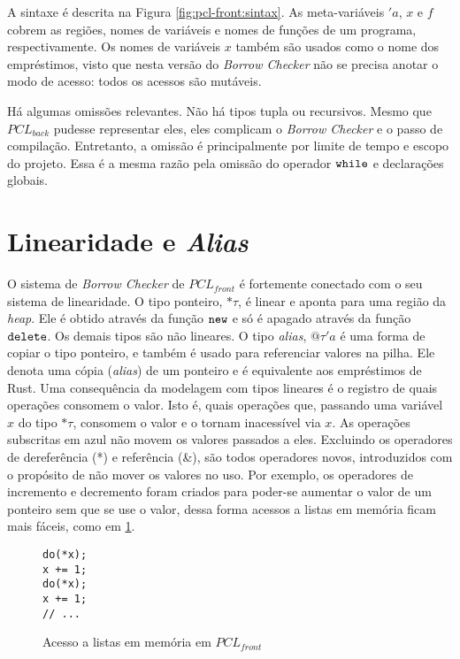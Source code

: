 A sintaxe é descrita na Figura \ref{fig:pcl-front:sintax}. As meta-variáveis \noindent$'a$, $x$ e $f$ cobrem as regiões, nomes de variáveis e nomes de funções de um programa, respectivamente. Os nomes de variáveis $x$ também são usados como o nome dos empréstimos, visto que nesta versão do \emph{Borrow Checker} não se precisa anotar o modo de acesso: todos os acessos são mutáveis.
 
Há algumas omissões relevantes. Não há tipos tupla ou recursivos. Mesmo que $PCL_{back}$ pudesse representar eles, eles complicam o \emph{Borrow Checker} e o passo de compilação. Entretanto, a omissão é principalmente por limite de tempo e escopo do projeto. Essa é a mesma razão pela omissão do operador $\texttt{while}$ e declarações globais.


\section{Linearidade e \emph{Alias}}

O sistema de \emph{Borrow Checker} de $PCL_{front}$ é fortemente conectado com o seu sistema de linearidade. O tipo ponteiro, $\text{*}\tau$, é linear e aponta para uma região da \emph{heap}. Ele é obtido através da função $\texttt{new}$ e só é apagado através da função $\texttt{delete}$. Os demais tipos são não lineares. O tipo \emph{alias}, $@\tau'a$ é uma forma de copiar o tipo ponteiro, e também é usado para referenciar valores na pilha. Ele denota uma cópia (\emph{alias}) de um ponteiro e é equivalente aos empréstimos de Rust. Uma consequência da modelagem com tipos lineares é o registro de quais operações consomem o valor. Isto é, quais operações que, passando uma variável $x$ do tipo $\text{*}\!\tau$, consomem o valor e o tornam inacessível via $x$. As operações subscritas em azul não movem os valores passados a eles. Excluindo os operadores de dereferência (*) e referência (\&), são todos operadores novos, introduzidos com o propósito de não mover os valores no uso. Por exemplo, os operadores de incremento e decremento foram criados para poder-se aumentar o valor de um ponteiro sem que se use o valor, dessa forma acessos a listas em memória ficam mais fáceis, como em \ref{fig:pcl-front:inc}.

\begin{figure}[ht]
	\caption{Acesso a listas em memória em $PCL_{front}$}
	\label{fig:pcl-front:inc}
	\begin{lstlisting}[language=PCLfront]
do(*x);
x += 1;
do(*x);
x += 1;
// ...
	\end{lstlisting}
\end{figure}

